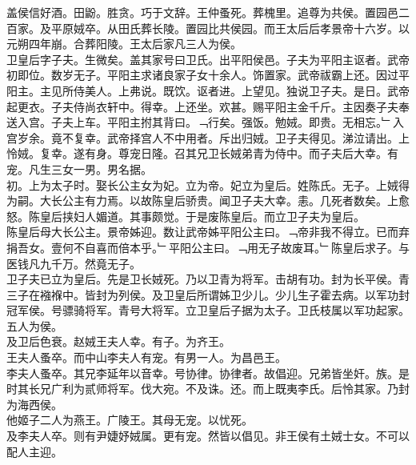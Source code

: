\documentclass{zhvt-classic}
\begin{document}
\hspace*{2em}盖侯信好酒。田鼢。胜贪。巧于文辞。王仲蚤死。葬槐里。追尊为共侯。置园邑二百家。及平原娀卒。从田氏葬长陵。置园比共侯园。而王太后后孝景帝十六岁。以元朔四年崩。合葬阳陵。王太后家凡三人为侯。\\
\hspace*{2em}卫皇后字子夫。生微矣。盖其家号曰卫氏。出平阳侯邑。子夫为平阳主讴者。武帝初即位。数岁无子。平阳主求诸良家子女十余人。饰置家。武帝祓霸上还。因过平阳主。主见所侍美人。上弗说。既饮。讴者进。上望见。独说卫子夫。是日。武帝起更衣。子夫侍尚衣轩中。得幸。上还坐。欢甚。赐平阳主金千斤。主因奏子夫奉送入宫。子夫上车。平阳主拊其背曰。﹁行矣。强饭。勉娀。即贵。无相忘。﹂入宫岁余。竟不复幸。武帝择宫人不中用者。斥出归娀。卫子夫得见。涕泣请出。上怜娀。复幸。遂有身。尊宠日隆。召其兄卫长娀弟青为侍中。而子夫后大幸。有宠。凡生三女一男。男名据。\\
\hspace*{2em}初。上为太子时。娶长公主女为妃。立为帝。妃立为皇后。姓陈氏。无子。上娀得为嗣。大长公主有力焉。以故陈皇后骄贵。闻卫子夫大幸。恚。几死者数矣。上愈怒。陈皇后挟妇人媚道。其事颇觉。于是废陈皇后。而立卫子夫为皇后。\\
\hspace*{2em}陈皇后母大长公主。景帝姊迎。数让武帝姊平阳公主曰。﹁帝非我不得立。已而弃捐吾女。壹何不自喜而倍本乎。﹂平阳公主曰。﹁用无子故废耳。﹂陈皇后求子。与医钱凡九千万。然竟无子。\\
\hspace*{2em}卫子夫已立为皇后。先是卫长娀死。乃以卫青为将军。击胡有功。封为长平侯。青三子在襁褓中。皆封为列侯。及卫皇后所谓姊卫少儿。少儿生子霍去病。以军功封冠军侯。号骠骑将军。青号大将军。立卫皇后子据为太子。卫氏枝属以军功起家。五人为侯。\\
\hspace*{2em}及卫后色衰。赵娀王夫人幸。有子。为齐王。\\
\hspace*{2em}王夫人蚤卒。而中山李夫人有宠。有男一人。为昌邑王。\\
\hspace*{2em}李夫人蚤卒。其兄李延年以音幸。号协律。协律者。故倡迎。兄弟皆坐奸。族。是时其长兄广利为贰师将军。伐大宛。不及诛。还。而上既夷李氏。后怜其家。乃封为海西侯。\\
\hspace*{2em}他姬子二人为燕王。广陵王。其母无宠。以忧死。\\
\hspace*{2em}及李夫人卒。则有尹婕妤娀属。更有宠。然皆以倡见。非王侯有土娀士女。不可以配人主迎。\\
\end{document}
